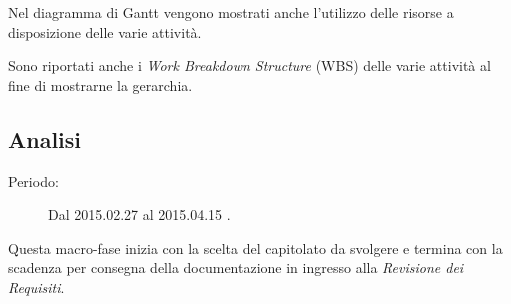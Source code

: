 \noindent Nel diagramma di Gantt vengono mostrati anche l'utilizzo delle risorse a disposizione delle varie attività.

\noindent Sono riportati anche i \textit{Work Breakdown Structure} (WBS) delle varie attività al fine di mostrarne la gerarchia.

\subsection{Analisi}
\begin{description}
	\item[Periodo:] Dal 2015.02.27 al 2015.04.15 .
\end{description}
Questa macro-fase inizia con la scelta del capitolato da svolgere e termina con la scadenza per consegna della documentazione in ingresso alla \textit{Revisione dei Requisiti}. 

